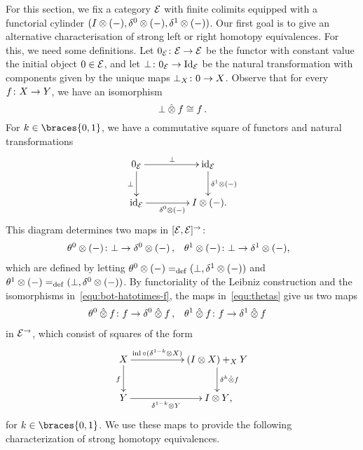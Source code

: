 \documentclass[reqno,10pt,a4paper,oneside,draft]{amsart}
\begin{document}
For this section, we fix a category $\mathcal{E}$ with finite colimits equipped with a functorial cylinder $(I \otimes (-), \delta^0 \otimes (-), \delta^1 \otimes (-))$.
Our first goal is to give an alternative characterisation of strong left or right homotopy equivalences.
For this, we need some definitions.
Let $0_{\mathcal{E}} \colon \mathcal{E} \to \mathcal{E}$ be the functor with constant value the initial object $0 \in \mathcal{E}$, and let $\bot \colon 0_{\mathcal{E}} \rightarrow \operatorname{Id}_{\mathcal{E}}$ be the natural transformation with components given by the unique maps $\bot_X \colon 0 \to X$.
Observe that for every $f \colon X \to Y$, we have an isomorphism
\begin{equation}
\label{equ:bot-hatotimes-f}
\bot \mathbin{\hat{\otimes}} f \cong f \, .
\end{equation}
For $k \in \braces{0, 1}$, we have a commutative square of functors and natural transformations
\[
\xymatrix@C+2em{
  0_\catE
  \ar[r]^{\bot}
  \ar[d]_{\bot}
&
  \id_\catE
  \ar[d]^{\rcyl \otimes (-)}
\\
  \id_\catE
  \ar[r]_{\lcyl \otimes (-)}
&
  \interval \otimes (-)
\rlap{.}}
\]
This diagram determines two maps in $[\mathcal{E}, \mathcal{E}]^\to$:
\begin{equation} \label{equ:thetas}
\begin{aligned}
  \thetal \otimes (-) &\co \bot \rightarrow \lcyl \otimes (-)
\, ,&
  \thetar \otimes (-) &\co \bot \rightarrow \rcyl \otimes (-) \rlap{,}
\end{aligned}
\end{equation}
which are defined by letting $\theta^0 \otimes (-) =_{\operatorname{def}} (\bot, \delta^1 \otimes (-))$ and $\theta^1 \otimes (-) =_{\operatorname{def}} (\bot, \delta^0 \otimes (-))$.
By functoriality of the Leibniz construction and the isomorphisms in~\eqref{equ:bot-hatotimes-f}, the maps in~\eqref{equ:thetas} give us two maps
\begin{equation*}
\begin{aligned}
  \theta^0 \mathbin{\hat{\otimes}} f &\colon f \to \delta^0 \mathbin{\hat{\otimes}} f
\, ,&
  \theta^1 \mathbin{\hat{\otimes}} f &\colon f \to \delta^1 \mathbin{\hat{\otimes}} f
\end{aligned}
\end{equation*}
in $\mathcal{E}^\to$, which consist of squares of the form
\[
\xymatrix@C+3em{
  X
  \ar[r]^-{\inl \cc (\kcylinv \otimes X)}
  \ar[d]_{f}
&
  (\interval \otimes X) +_{X} Y \ar[d]^{\kcyl \hatotimes f}
\\
  Y
  \ar[r]_-{\kcylinv \otimes Y}
&
  \interval \otimes Y
\rlap{,}}
\]
for $k \in \braces{0, 1}$.
We use these maps to provide the following characterization of strong homotopy equivalences.
\end{document}
